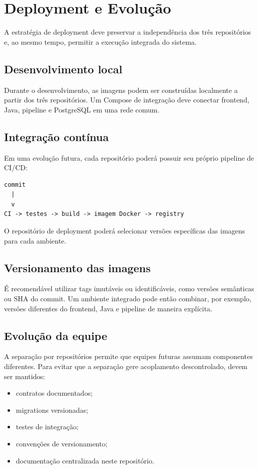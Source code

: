 \section{Deployment e Evolução}

A estratégia de deployment deve preservar a independência dos três repositórios e, ao mesmo tempo, permitir a execução integrada do sistema.

\subsection{Desenvolvimento local}

Durante o desenvolvimento, as imagens podem ser construídas localmente a partir dos três repositórios. Um Compose de integração deve conectar frontend, Java, pipeline e PostgreSQL em uma rede comum.

\subsection{Integração contínua}

Em uma evolução futura, cada repositório poderá possuir seu próprio pipeline de CI/CD:

\begin{lstlisting}
commit
  |
  v
CI -> testes -> build -> imagem Docker -> registry
\end{lstlisting}

O repositório de deployment poderá selecionar versões específicas das imagens para cada ambiente.

\subsection{Versionamento das imagens}

É recomendável utilizar tags imutáveis ou identificáveis, como versões semânticas ou SHA do commit. Um ambiente integrado pode então combinar, por exemplo, versões diferentes do frontend, Java e pipeline de maneira explícita.

\subsection{Evolução da equipe}

A separação por repositórios permite que equipes futuras assumam componentes diferentes. Para evitar que a separação gere acoplamento descontrolado, devem ser mantidos:

\begin{itemize}
    \item contratos documentados;
    \item migrations versionadas;
    \item testes de integração;
    \item convenções de versionamento;
    \item documentação centralizada neste repositório.
\end{itemize}

